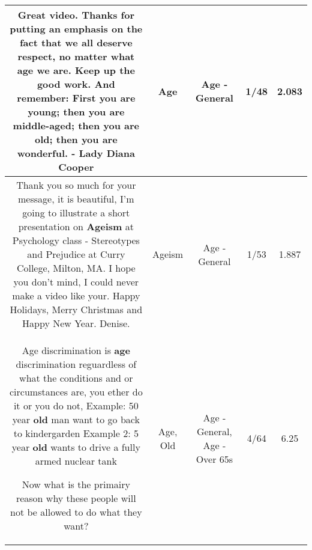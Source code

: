 \documentclass[11pt]{article}
\newlength\mylength
\begin{document}
\begin{center}
\begin{longtable}{|C{.65\mylength}|C{.30\mylength}|C{.12\mylength}|C{.12\mylength}|C{.12\mylength}|}
  \small Great video.  Thanks for putting an emphasis on the fact that we all deserve respect, no matter what \textbf{age} we are.  Keep up the good work.  And remember: First you are young; then you are middle-aged; then you are old; then you are wonderful. - Lady Diana Cooper\normalsize   & Age & Age - General & 1/48 & 2.083 \\  \hline
  \small Thank you so much for your message, it is beautiful, I'm going to illustrate a short presentation on \textbf{Ageism} at Psychology class - Stereotypes and Prejudice at Curry College, Milton, MA. I hope you don't mind, I could never make a video like your. Happy Holidays, Merry Christmas and Happy New Year. Denise.\normalsize   & Ageism & Age - General & 1/53 & 1.887 \\  \hline
  \small Age discrimination is \textbf{age} discrimination reguardless of what the conditions and or circumstances are, you ether do it or you do not,
Example: 50 year \textbf{old} man want to go back to kindergarden 
Example 2: 5 year \textbf{old} wants to drive a fully armed nuclear tank

Now what is the primairy reason why these people will not be allowed to do what they want?\normalsize   & Age, Old & Age - General, Age - Over 65s & 4/64 & 6.25 \\  \hline
  
\end{longtable}
\end{center}
\end{document}
